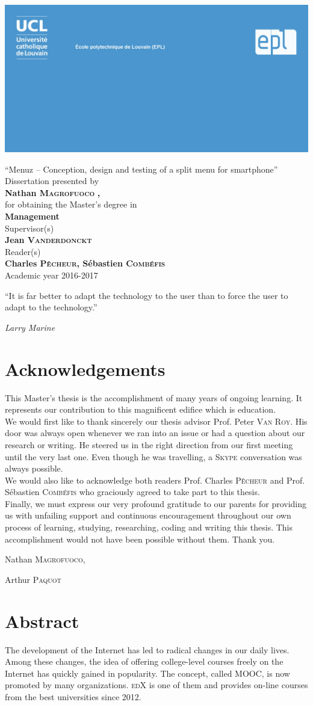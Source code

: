 \documentclass[11pt,a4paper,twoside,openright]{report}
\renewcommand\title{\enquote{Menuz -- Conception, design and testing of a split 
menu for smartphone}}
\newcommand\nameone{Nathan \textsc{Magrofuoco}}
\newcommand\speciality{Management}
\newcommand\supervisor{Jean \textsc{Vanderdonckt}}
\newcommand\readerone{Charles \textsc{Pêcheur}}
\newcommand\readertwo{Sébastien \textsc{Combéfis}}
\newcommand\years{2016-2017}	%
\renewcommand{\maketitle}
	{\begin{titlepage}
	\newgeometry{top=1.25cm,bottom=1.25cm,left=1.25cm,right=1.25cm}
	\begin{center}
		\includegraphics[scale=1]{EPL_TFEbanner.jpg}
	\end{center}
	\vspace*{9pt}
	\begin{flushright}
	    \color{UCLblue} \fontfamily{phv} \selectfont
	    {\huge \title} \\
	    \vspace*{12pt}
	    \vspace*{12pt}
		\large Dissertation presented by \\
		\textbf{\nameone}
		\textbf{, \nametwo}		%
		\\
		\vspace*{12pt} 
		for obtaining the Master's degree in \\
		\textbf{\speciality} \\
		\vspace*{12pt}
		Supervisor(s)\\
		\textbf{\supervisor} 
		\\
		\vspace*{12pt}
		Reader(s) \\
		\textbf{\readerone, \readertwo}
		\\
		\vspace*{12pt}
		Academic year \years \\
	\end{flushright}
	\vspace*{9pt}
	\color{EPLblue}{\rule{18.5cm}{8.25cm}}
  \end{titlepage}}
\begin{document}
\maketitle		%
\thispagestyle{empty}	

\null\newpage
\thispagestyle{empty}
\epigraph{\enquote{It is far better to adapt the technology to the user than to 
force the user to adapt to the technology.}}{\textit{Larry Marine}}
\null\newpage
\thispagestyle{empty}

\null\newpage


\chapter*{Acknowledgements}

This Master's thesis is the accomplishment of many years of ongoing learning. 
It represents our contribution to this magnificent edifice which is education.\\

We would first like to thank sincerely our thesis advisor Prof. Peter 
\textsc{Van Roy}. His door was always open whenever we ran into an issue or had 
a question about our research or writing. He steered us in the right direction 
from our first meeting until the very last one. Even though he was 
travelling, a \textsc{Skype} conversation was always possible.\\

We would also like to acknowledge both readers Prof. Charles \textsc{Pêcheur} 
and Prof. Sébastien \textsc{Combéfis} who graciously agreed to take part to 
this thesis.\\

Finally, we must express our very profound gratitude to our parents for 
providing us with unfailing support and continuous encouragement throughout our 
own process of learning, studying, researching, coding and writing this 
thesis. This accomplishment would not have been possible without them. Thank 
you.\\

\begin{flushright}
Nathan \textsc{Magrofuoco},

Arthur \textsc{Paquot}
\end{flushright}

\null\newpage

\chapter*{Abstract}
The development of the Internet has led to radical changes in our daily lives. 
Among these changes, the idea of offering college-level courses freely on the 
Internet has quickly gained in popularity. The concept, called \textsc{MOOC}, 
is now promoted by many organizations. \textsc{edX} is one of them and provides 
on-line courses from the best universities since 2012.\\
\end{document}
